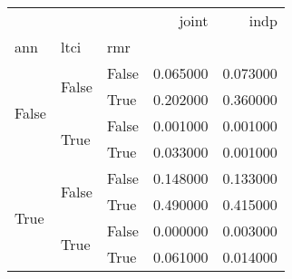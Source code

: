 \begin{tabular}{lllrr}
\toprule
 &  &  & joint & indp \\
ann & ltci & rmr &  &  \\
\midrule
\multirow[t]{4}{*}{False} & \multirow[t]{2}{*}{False} & False & 0.065000 & 0.073000 \\
 &  & True & 0.202000 & 0.360000 \\
\cline{2-5}
 & \multirow[t]{2}{*}{True} & False & 0.001000 & 0.001000 \\
 &  & True & 0.033000 & 0.001000 \\
\cline{1-5} \cline{2-5}
\multirow[t]{4}{*}{True} & \multirow[t]{2}{*}{False} & False & 0.148000 & 0.133000 \\
 &  & True & 0.490000 & 0.415000 \\
\cline{2-5}
 & \multirow[t]{2}{*}{True} & False & 0.000000 & 0.003000 \\
 &  & True & 0.061000 & 0.014000 \\
\cline{1-5} \cline{2-5}
\bottomrule
\end{tabular}
